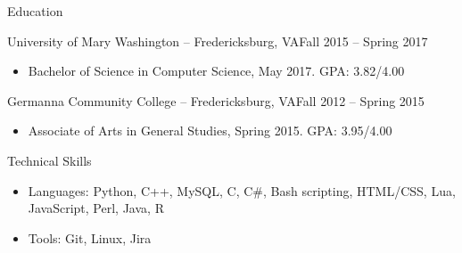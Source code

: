 \documentclass[calibri]{mcdowellcv}
\begin{document}
	\begin{cvsection}{Education}
		\begin{cvsubsection}{University of Mary Washington -- Fredericksburg, VA}{Fall 2015 -- Spring 2017}
			\begin{itemize}
				\item Bachelor of Science in Computer Science, May 2017. GPA: 3.82/4.00
			\end{itemize}
		\end{cvsubsection}
		\begin{cvsubsection}{Germanna Community College -- Fredericksburg, VA}{Fall 2012 -- Spring 2015}
			\begin{itemize}
				\item Associate of Arts in General Studies, Spring 2015. GPA: 3.95/4.00
			\end{itemize}
		\end{cvsubsection}
	\end{cvsection}
	
	\begin{cvsection}{Technical Skills}
		\begin{cvsubsection}{}{}{}	
			\begin{itemize}
				\item Languages: Python, C++, MySQL, C, C\#, Bash scripting, HTML/CSS, Lua, JavaScript, Perl, Java, R 
				\item Tools: Git, Linux, Jira
			\end{itemize}
		\end{cvsubsection}
	\end{cvsection}
	
\end{document}
